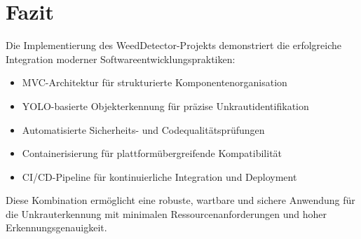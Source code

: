 \documentclass[12pt]{scrreprt}
\begin{document}
\chapter{Fazit}

Die Implementierung des WeedDetector-Projekts demonstriert die erfolgreiche Integration moderner Softwareentwicklungspraktiken:

\begin{itemize}
    \item MVC-Architektur für strukturierte Komponentenorganisation
    \item YOLO-basierte Objekterkennung für präzise Unkrautidentifikation
    \item Automatisierte Sicherheits- und Codequalitätsprüfungen
    \item Containerisierung für plattformübergreifende Kompatibilität
    \item CI/CD-Pipeline für kontinuierliche Integration und Deployment
\end{itemize}

Diese Kombination ermöglicht eine robuste, wartbare und sichere Anwendung für die Unkrauterkennung mit minimalen Ressourcenanforderungen und hoher Erkennungsgenauigkeit.
\end{document}
